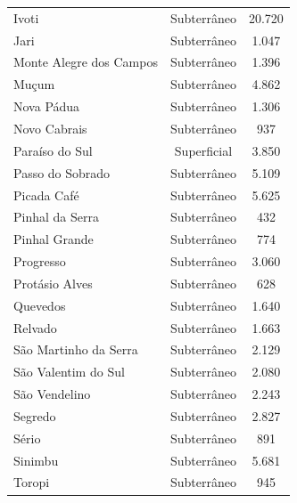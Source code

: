 \begin{apendicesenv}
\begin{table}[!htb]
\begin{tabular}{lcc}
Ivoti                   & Subterrâneo        & 20.720                        \\
Jari                    & Subterrâneo        & 1.047                         \\
Monte Alegre dos Campos & Subterrâneo        & 1.396                         \\
Muçum                   & Subterrâneo        & 4.862                         \\
Nova Pádua              & Subterrâneo        & 1.306                         \\
Novo Cabrais            & Subterrâneo        & 937                           \\
Paraíso do Sul          & Superficial        & 3.850                         \\
Passo do Sobrado        & Subterrâneo        & 5.109                         \\
Picada Café             & Subterrâneo        & 5.625                         \\
Pinhal da Serra         & Subterrâneo        & 432                           \\
Pinhal Grande           & Subterrâneo        & 774                           \\
Progresso               & Subterrâneo        & 3.060                         \\
Protásio Alves          & Subterrâneo        & 628                           \\
Quevedos                & Subterrâneo        & 1.640                         \\
Relvado                 & Subterrâneo        & 1.663                         \\
São Martinho da Serra   & Subterrâneo        & 2.129                         \\
São Valentim do Sul     & Subterrâneo        & 2.080                         \\
São Vendelino           & Subterrâneo        & 2.243                         \\
Segredo                 & Subterrâneo        & 2.827                         \\
Sério                   & Subterrâneo        & 891                           \\
Sinimbu                 & Subterrâneo        & 5.681                         \\
Toropi                  & Subterrâneo        & 945                           \\

\end{tabular}
\end{table}
\end{apendicesenv}

